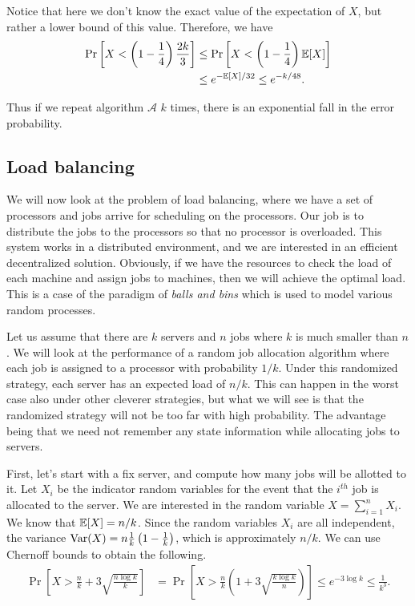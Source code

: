 Notice that here we don't know the exact value of the expectation of $X$, but rather a lower bound of this value. Therefore, we have
\begin{align*}
	\Pr\left[ X < \left(1 - \frac{1}{4}\right) \frac{2k}{3} \right] &\leq \Pr\left[ X < \left(1 - \frac{1}{4}\right) \mathbb{E}[X] \right]\\
	&\leq e^{-\mathbb{E}[X]/32} \leq e^{-k/48}. 
\end{align*}

Thus if we repeat algorithm $\mathcal{A}$ $k$ times, there is an exponential fall in the error probability.

\subsection{Load balancing}

We will now look at the problem of load balancing, where we have a set of processors and jobs arrive for scheduling on the processors. Our job is to distribute the jobs to the processors so that no processor is overloaded. This system works in a distributed environment, and we are interested in an efficient decentralized solution. Obviously, if we have the resources to check the load of each machine and assign jobs to machines, then we will achieve the optimal load. This is a case of the paradigm of \emph{balls and bins} which is used to model various random processes.

Let us assume that there are $k$ servers and $n$ jobs where $k$ is much smaller than $n$. We will look at the performance of a random job allocation algorithm where each job is assigned to a processor with probability $1/k$. Under this randomized strategy, each server has an expected load of $n/k$. This can happen in the worst case also under other cleverer strategies, but what we will see is that the randomized strategy will not be too far with high probability. The advantage being that we need not remember any state information while allocating jobs to servers. 

First, let's start with a fix server, and compute how many jobs will be allotted to it. Let $X_i$ be the indicator random variables for the event that the $i^{th}$ job is allocated to the server. We are interested in the random variable $X = \sum_{i=1}^n X_i$. We know that $\mathbb{E}[X] = n/k$. Since the random variables $X_i$ are all independent, the variance $\operatorname{Var}(X) = n\frac{1}{k}\left(1 - \frac{1}{k} \right)$, which is approximately $n/k$. We can use Chernoff bounds to obtain the following.
\begin{align*}
	\Pr\left[ X > \frac{n}{k} + 3\sqrt{\frac{n\log k}{k}} \right] &= \Pr \left[ X > \frac{n}{k}\left( 1 + 3\sqrt{\frac{k\log k}{n}} \right) \right] %
	 \leq e^{-3\log k} \leq \frac{1}{k^3}.
\end{align*}


